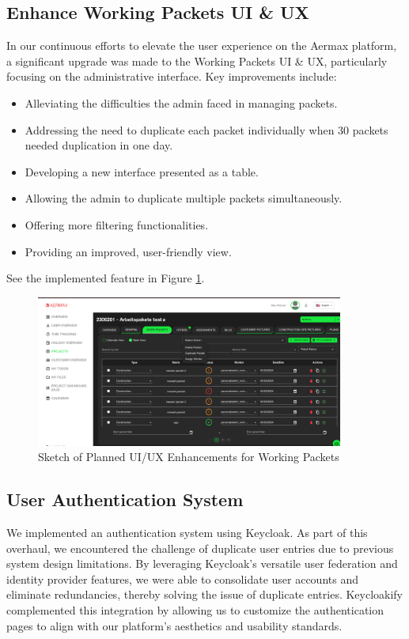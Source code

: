 \subsection{Enhance Working Packets UI \& UX}
In our continuous efforts to elevate the user experience on the Aermax platform, a significant upgrade was made to the Working Packets UI \& UX, particularly focusing on the administrative interface. Key improvements include:

\begin{itemize}
    \item Alleviating the difficulties the admin faced in managing packets.
    \item Addressing the need to duplicate each packet individually when 30 packets needed duplication in one day.
    \item Developing a new interface presented as a table.
    \item Allowing the admin to duplicate multiple packets simultaneously.
    \item Offering more filtering functionalities.
    \item Providing an improved, user-friendly view.
\end{itemize}

See the implemented feature in Figure \ref{fig:ui_ux_enhancements}.

\begin{figure}[H]
    \centering
    \includegraphics[width=0.9\textwidth]{src/assets/chapters/newTable2.png}
    \caption{Sketch of Planned UI/UX Enhancements for Working Packets}
    \label{fig:ui_ux_enhancements}
\end{figure}

\subsection{User Authentication System}
We implemented an authentication system using Keycloak. As part of this overhaul, we encountered the challenge of duplicate user entries due to previous system design limitations. By leveraging Keycloak’s versatile user federation and identity provider features, we were able to consolidate user accounts and eliminate redundancies, thereby solving the issue of duplicate entries. Keycloakify complemented this integration by allowing us to customize the authentication pages to align with our platform's aesthetics and usability standards.

